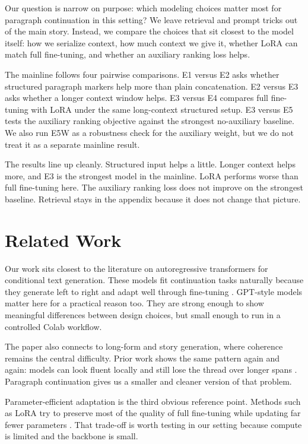\documentclass{article}
\newcommand{\expid}[1]{\textsc{#1}}
\begin{document}
Our question is narrow on purpose: which modeling choices matter most for paragraph continuation in this setting? We leave retrieval and prompt tricks out of the main story. Instead, we compare the choices that sit closest to the model itself: how we serialize context, how much context we give it, whether LoRA can match full fine-tuning, and whether an auxiliary ranking loss helps.

The mainline follows four pairwise comparisons. \expid{E1} versus \expid{E2} asks whether structured paragraph markers help more than plain concatenation. \expid{E2} versus \expid{E3} asks whether a longer context window helps. \expid{E3} versus \expid{E4} compares full fine-tuning with LoRA under the same long-context structured setup. \expid{E3} versus \expid{E5} tests the auxiliary ranking objective against the strongest no-auxiliary baseline. We also run \expid{E5W} as a robustness check for the auxiliary weight, but we do not treat it as a separate mainline result.

The results line up cleanly. Structured input helps a little. Longer context helps more, and \expid{E3} is the strongest model in the mainline. LoRA performs worse than full fine-tuning here. The auxiliary ranking loss does not improve on the strongest baseline. Retrieval stays in the appendix because it does not change that picture.

\section{Related Work}

Our work sits closest to the literature on autoregressive transformers for conditional text generation. These models fit continuation tasks naturally because they generate left to right and adapt well through fine-tuning \citep{vaswani2017attention,radford2019language}. GPT-style models matter here for a practical reason too. They are strong enough to show meaningful differences between design choices, but small enough to run in a controlled Colab workflow.

The paper also connects to long-form and story generation, where coherence remains the central difficulty. Prior work shows the same pattern again and again: models can look fluent locally and still lose the thread over longer spans \citep{fan2018hierarchical,holtzman2020curious}. Paragraph continuation gives us a smaller and cleaner version of that problem.

Parameter-efficient adaptation is the third obvious reference point. Methods such as LoRA try to preserve most of the quality of full fine-tuning while updating far fewer parameters \citep{hu2022lora}. That trade-off is worth testing in our setting because compute is limited and the backbone is small.
\end{document}
